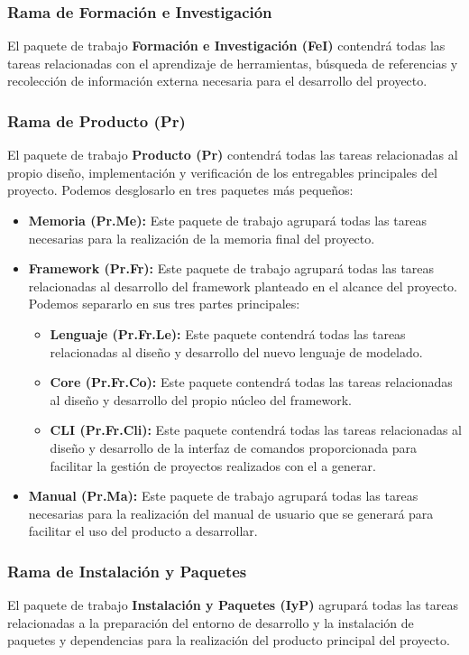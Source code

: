 \subsubsection{Rama de Formación e Investigación}
El paquete de trabajo \textbf{Formación e Investigación (FeI)} contendrá todas
las tareas relacionadas con el aprendizaje de herramientas, búsqueda de
referencias y recolección de información externa necesaria para el desarrollo
del proyecto.

\subsubsection{Rama de Producto (Pr)}
El paquete de trabajo \textbf{Producto (Pr)} contendrá todas las tareas
relacionadas al propio diseño, implementación y verificación de los entregables
principales del proyecto. Podemos desglosarlo en tres paquetes más pequeños:
\begin{itemize}
    \item \textbf{Memoria (Pr.Me):} Este paquete de trabajo agrupará todas las
    tareas necesarias para la realización de la memoria final del proyecto.
    \item \textbf{Framework (Pr.Fr):} Este paquete de trabajo agrupará todas las
    tareas relacionadas al desarrollo del framework planteado en el alcance del
    proyecto. Podemos separarlo en sus tres partes principales:
    \begin{itemize}
        \item \textbf{Lenguaje (Pr.Fr.Le):} Este paquete contendrá todas las
        tareas relacionadas al diseño y desarrollo del nuevo lenguaje de
        modelado.
        \item \textbf{Core (Pr.Fr.Co):} Este paquete contendrá todas las
        tareas relacionadas al diseño y desarrollo del propio núcleo del
        framework.
        \item \textbf{CLI (Pr.Fr.Cli):} Este paquete contendrá todas las
        tareas relacionadas al diseño y desarrollo de la interfaz de comandos
        proporcionada para facilitar la gestión de proyectos realizados con el
        a generar.
    \end{itemize}
    \item \textbf{Manual (Pr.Ma):} Este paquete de trabajo agrupará todas las
    tareas necesarias para la realización del manual de usuario que se generará
    para facilitar el uso del producto a desarrollar.
\end{itemize}

\subsubsection{Rama de Instalación y Paquetes}
El paquete de trabajo \textbf{Instalación y Paquetes (IyP)} agrupará todas las
tareas relacionadas a la preparación del entorno de desarrollo y la instalación
de paquetes y dependencias para la realización del producto principal del
proyecto.

